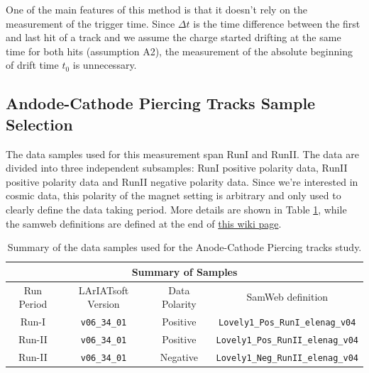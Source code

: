One of the main features of this method is that it doesn't rely on the measurement of the trigger time. Since $\Delta t$ is the time difference between the first and last hit of a track and we assume the charge started drifting at the same time for both hits (assumption A2), the measurement of the absolute beginning of drift time $t_0$ is unnecessary. 

\subsection{Andode-Cathode Piercing Tracks Sample Selection}\label{sec:SampleSelectionCA}

The data samples used for this measurement span RunI and RunII. The data are divided into three independent subsamples: RunI positive polarity data, RunII positive polarity data and RunII negative polarity data. Since we're interested in cosmic data, this polarity of the magnet setting is arbitrary and only used to clearly define the data taking period. More details are shown in Table \ref{tab:samples}, while the samweb definitions are defined at the end of \href{https://redmine.fnal.gov/redmine/projects/lardbt/wiki/Recommended_SAM_Datasets}{this wiki page}.

\begin{center}
\begin{table}[htb]
  \begin{center}
    \begin{tabular}{c|c|c|c}
      \multicolumn{4}{c}{\textbf{Summary of Samples}} \\
      \hline \hline
       Run Period & LArIATsoft Version & Data Polarity  & SamWeb definition\\
       \hline
       Run-I & \verb!v06_34_01! & Positive &  \verb!Lovely1_Pos_RunI_elenag_v04!\\
       \hline
       Run-II & \verb!v06_34_01! & Positive  & \verb!Lovely1_Pos_RunII_elenag_v04! \\
       \hline
       Run-II & \verb!v06_34_01! & Negative  & \verb!Lovely1_Neg_RunII_elenag_v04! \\
       \hline
       \end{tabular}%
    \caption{Summary of the data samples used for the Anode-Cathode Piercing tracks study. }
    \label{tab:samples}
    \end{center}
\end{table}
\end{center}

